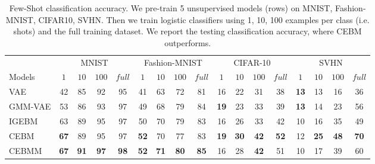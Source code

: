 \documentclass[tablecaption=bottom,wcp]{jmlr} %
\begin{document}
\setlength{\tabcolsep}{5pt}
\begin{table}[!t]
\scriptsize
\centering
\begin{tabular}{l|cccc|cccc|cccc|cccc}
\toprule
 & \multicolumn{4}{c}{MNIST} & \multicolumn{4}{|c}{Fashion-MNIST} & \multicolumn{4}{|c}{CIFAR-10} & \multicolumn{4}{|c}{SVHN}\\
Models & $1$ & $10$  & $100$ & $full$ & $1$ & $10$  & $100$ & $full$ & $1$ & $10$  & $100$ & $full$ & $1$ & $10$  & $100$ & $full$ \\
\midrule
\midrule
VAE & 42 & 85 & 92 & 95 & 41 & 63 & 72 & 81 & 16 & 22 & 31 & 38 & \textbf{13} & 13 & 16 & 36\\
GMM-VAE & 53 & 86 & 93 & 97 & 49 & 68 & 79 & 84 & \textbf{19} & 23 & 33 & 39 & \textbf{13} & 14 & 23 & 56  \\
\midrule
IGEBM & 63 & 89 & 95 & 97 & 50 & 70 & 79 & 83 & 16 & 26 & 33 & 42 & 10 & 16 & 35 & 49\\
CEBM & \textbf{67} & 89 & 95 & 97 & \textbf{52} & 70 & 77 & 83 & \textbf{19} & \textbf{30} & \textbf{42} & \textbf{52} & 12 & \textbf{25} & \textbf{48} & \textbf{70}\\
CEBMM & \textbf{67} & \textbf{91} & \textbf{97} & \textbf{98} &\textbf{52} & \textbf{71} & \textbf{80} & \textbf{85} & 16 & 28 & \textbf{42} & 51 & 10 & 17 & 39 & 60 \\
\bottomrule
\end{tabular}
\label{tab:few-shot classification}
\caption{Few-Shot classification accuracy. We pre-train 5 unsupervised models (rows) on MNIST, Fashion-MNIST, CIFAR10, SVHN. Then we train logistic classifiers using 1, 10, 100 examples per class (i.e. shots) and the full training dataset. We report the testing classification accuracy, where CEBM outperforms.}
\end{table}

\end{document}
